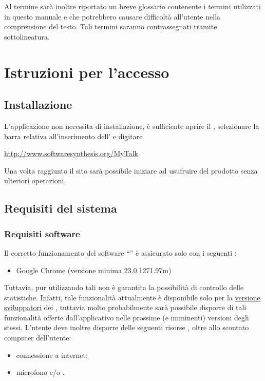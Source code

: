Al termine sarà inoltre riportato un breve glossario contenente i termini utilizzati in questo manuale e che potrebbero causare difficoltà all'utente nella comprensione del testo. Tali termini saranno contrassegnati tramite sottolineatura. 

\section{Istruzioni per l'accesso}

\subsection{Installazione}
L'applicazione non necessita di installazione, è sufficiente aprire il , selezionare la barra relativa all'inserimento dell'\underline{} e digitare
\begin{center}
 \url{http://www.softwaresynthesis.org/MyTalk}
\end{center}
Una volta raggiunto il sito sarà possibile iniziare ad usufruire del prodotto senza ulteriori operazioni.

\subsection{Requisiti del sistema}
\subsubsection{Requisiti software}
Il corretto funzionamento del software ``\caName'' è assicurato solo con i seguenti :
\begin{itemize}
  \item Google Chrome (versione minima 23.0.1271.97m)
\end{itemize}

Tuttavia, pur utilizzando tali  non è garantita la possibilità di controllo delle statistiche. Infatti, tale funzionalità attualmente è disponibile solo per la \underline{versione sviluppatori} dei , tuttavia molto probabilmente sarà possibile disporre di tali funzionalità offerte dall'applicativo nelle prossime (e imminenti) versioni degli stessi.
L'utente deve inoltre disporre delle seguenti risorse , oltre allo scontato computer dell'utente:
\begin{itemize}
  \item connessione a internet;
  \item microfono e/o  .
 \end{itemize}

